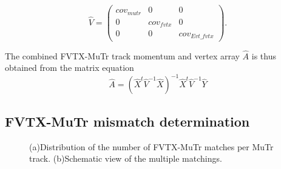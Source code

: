 \documentclass[12pt]{article}
\begin{document}
\begin{equation}
\hat{V} = \left(\begin{array}{ccc} cov_{mutr} & 0 & 0\\ 0 & cov_{fvtx} & 0 \\ 0 & 0 & cov_{Evt\_fvtx} \end{array} \right).
\end{equation}

The combined FVTX-MuTr track momentum and vertex array $\hat{A}$ is thus obtained from the matrix equation
\begin{equation}
	\hat{A} = \left(\hat{X}^t \hat{V}^{-1} \hat{X}\right)^{-1} \hat{X}^t \hat{V}^{-1}\hat{Y}
\end{equation}

\subsection{FVTX-MuTr mismatch determination}
\label{sec:mismatch}

\begin{figure}
\begin{center}
	\caption{\label{fig:mismatch}(a)Distribution of the number of FVTX-MuTr matches per MuTr track. (b)Schematic view of the multiple matchings.}
\end{center}
\end{figure}
\end{document}
